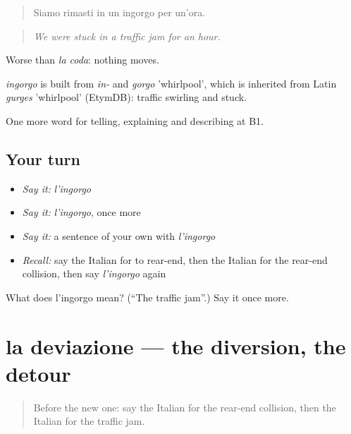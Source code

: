 \begin{quote}
Siamo rimasti in un ingorgo per un'ora.
\end{quote}

\begin{quote}
\emph{We were stuck in a traffic jam for an hour.}
\end{quote}

Worse than \emph{la coda}: nothing moves.

\begin{cousinweb}
\emph{ingorgo} is built from \emph{in-} and \emph{gorgo} 'whirlpool', which is inherited from Latin \emph{gurges} 'whirlpool' (EtymDB): traffic swirling and stuck.
\end{cousinweb}

\begin{grammarlens}[title={What you've built}]
One more word for telling, explaining and describing at B1.
\end{grammarlens}

\subsection*{Your turn}
\begin{itemize}
\raggedright
  \item \emph{Say it:} \emph{l'ingorgo}
  \item \emph{Say it:} \emph{l'ingorgo}, once more
  \item \emph{Say it:} a sentence of your own with \emph{l'ingorgo}
  \item \emph{Recall:} say the Italian for to rear-end, then the Italian for the rear-end collision, then say \emph{l'ingorgo} again
\end{itemize}

\begin{tcolorbox}[breakable,colback=teal!4,colframe=teal!35!black,title={Before you move on}]
What does l'ingorgo mean? (\textquotedblleft{}The traffic jam\textquotedblright{}.) Say it once more.
\end{tcolorbox}
\section[la deviazione]{la deviazione — the diversion, the detour}

\label{lesson:IT-C413-deviazione}



\begin{quote}
Before the new one: say the Italian for the rear-end collision, then the Italian for the traffic jam.
\end{quote}

